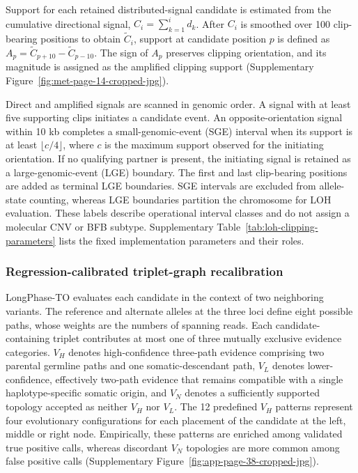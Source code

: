 \documentclass[pdflatex,sn-nature]{sn-jnl}
\begin{document}
Support for each retained distributed-signal candidate is estimated from the cumulative directional signal, \(C_i=\sum_{k=1}^{i}d_k\). After \(C_i\) is smoothed over 100 clip-bearing positions to obtain \(\widetilde{C}_i\), support at candidate position \(p\) is defined as \(A_p=\widetilde{C}_{p+10}-\widetilde{C}_{p-10}\). The sign of \(A_p\) preserves clipping orientation, and its magnitude is assigned as the amplified clipping support (Supplementary Figure~\ref{fig:met-page-14-cropped-jpg}).

Direct and amplified signals are scanned in genomic order. A signal with at least five supporting clips initiates a candidate event. An opposite-orientation signal within 10 kb completes a small-genomic-event (SGE) interval when its support is at least \(\lfloor c/4\rfloor\), where \(c\) is the maximum support observed for the initiating orientation. If no qualifying partner is present, the initiating signal is retained as a large-genomic-event (LGE) boundary. The first and last clip-bearing positions are added as terminal LGE boundaries. SGE intervals are excluded from allele-state counting, whereas LGE boundaries partition the chromosome for LOH evaluation. These labels describe operational interval classes and do not assign a molecular CNV or BFB subtype. Supplementary Table~\ref{tab:loh-clipping-parameters} lists the fixed implementation parameters and their roles.


\subsubsection{Regression-calibrated triplet-graph recalibration}\label{pattern-based-filtering-for-somatic-variant-calling}

LongPhase-TO evaluates each candidate in the context of two neighboring variants. The reference and alternate alleles at the three loci define eight possible paths, whose weights are the numbers of spanning reads. Each candidate-containing triplet contributes at most one of three mutually exclusive evidence categories. \(V_H\) denotes high-confidence three-path evidence comprising two parental germline paths and one somatic-descendant path, \(V_L\) denotes lower-confidence, effectively two-path evidence that remains compatible with a single haplotype-specific somatic origin, and \(V_N\) denotes a sufficiently supported topology accepted as neither \(V_H\) nor \(V_L\). The 12 predefined \(V_H\) patterns represent four evolutionary configurations for each placement of the candidate at the left, middle or right node. Empirically, these patterns are enriched among validated true positive calls, whereas discordant \(V_N\) topologies are more common among false positive calls (Supplementary Figure~\ref{fig:app-page-38-cropped-jpg}).
\end{document}
